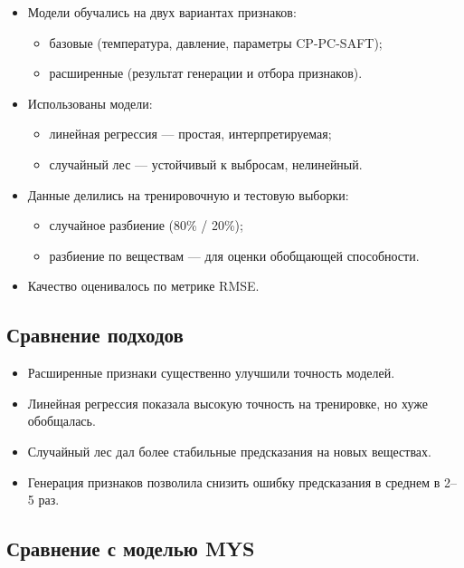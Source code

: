 \documentclass[a4paper,12pt]{article}
\begin{document}
    \begin{itemize}
      \item Модели обучались на двух вариантах признаков:
      \begin{itemize}
        \item базовые (температура, давление, параметры CP-PC-SAFT);
        \item расширенные (результат генерации и отбора признаков).
      \end{itemize}
      \item Использованы модели:
      \begin{itemize}
        \item линейная регрессия --- простая, интерпретируемая;
        \item случайный лес --- устойчивый к выбросам, нелинейный.
      \end{itemize}
      \item Данные делились на тренировочную и тестовую выборки:
      \begin{itemize}
        \item случайное разбиение (80\% / 20\%);
        \item разбиение по веществам — для оценки обобщающей способности.
      \end{itemize}
      \item Качество оценивалось по метрике RMSE.
    \end{itemize}

  \subsection{Сравнение подходов}

    \begin{itemize}
      \item Расширенные признаки существенно улучшили точность моделей.
      \item Линейная регрессия показала высокую точность на тренировке, но хуже обобщалась.
      \item Случайный лес дал более стабильные предсказания на новых веществах.
      \item Генерация признаков позволила снизить ошибку предсказания в среднем в 2--5 раз.
    \end{itemize}

  \subsection{Сравнение с моделью MYS}
\end{document}
